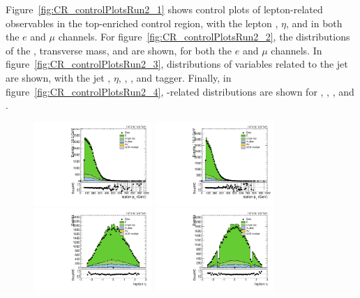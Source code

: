 Figure~\ref{fig:CR_controlPlotsRun2_1} shows control plots of lepton-related observables in the top-enriched control region, with the lepton \pt, $\eta$, and \Etmiss in both the $e$ and $\mu$ channels.
For figure~\ref{fig:CR_controlPlotsRun2_2}, the distributions of the \Wlep \pt, transverse mass, and \MVV are shown, for both the $e$ and $\mu$ channels.
In figure~\ref{fig:CR_controlPlotsRun2_3}, distributions of variables related to the \Vhad jet are shown, with the jet \pt, $\eta$, \MJ, \nsubjDDT, and \DoubleB tagger.
Finally, in figure~\ref{fig:CR_controlPlotsRun2_4}, \VBF-related distributions are shown for \DetaVBF, \mjjVBF, \nJets, and \Dy.

\begin{figure}[htbp]
  \centering
  \includegraphics[width=0.4\textwidth]{fig/controlPlots/CR_b1_mu_allP_allC_allE_Run2_lnujj_l1_l_pt.pdf}
  \includegraphics[width=0.4\textwidth]{fig/controlPlots/CR_b1_e_allP_allC_allE_Run2_lnujj_l1_l_pt.pdf}\\
  \includegraphics[width=0.4\textwidth]{fig/controlPlots/CR_b1_mu_allP_allC_allE_Run2_lnujj_l1_l_eta.pdf}
  \includegraphics[width=0.4\textwidth]{fig/controlPlots/CR_b1_e_allP_allC_allE_Run2_lnujj_l1_l_eta.pdf}\\

\end{figure}
